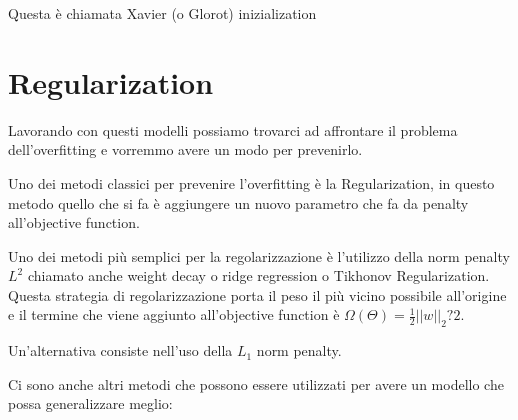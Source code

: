 \documentclass[14pt]{extreport}
\begin{document}
Questa è chiamata Xavier (o Glorot) inizialization

\section{Regularization}

Lavorando con questi modelli possiamo trovarci ad affrontare il problema 
dell'overfitting e vorremmo avere un modo per prevenirlo.

Uno dei metodi classici per prevenire l'overfitting è la Regularization, in questo metodo
quello che si fa è aggiungere un nuovo parametro che fa da penalty all'objective function.

Uno dei metodi più semplici per la regolarizzazione è l'utilizzo della norm penalty $L^2$
chiamato anche weight decay o ridge regression o Tikhonov Regularization.
Questa strategia di regolarizzazione porta il peso il più vicino possibile all'origine e 
il termine che viene aggiunto all'objective function è $\Omega(\Theta) = \frac{1}{2}||w||_2?2$.

Un'alternativa consiste nell'uso della $L_1$ norm penalty.

Ci sono anche altri metodi che possono essere utilizzati per avere un modello che possa generalizzare meglio:
\end{document}

